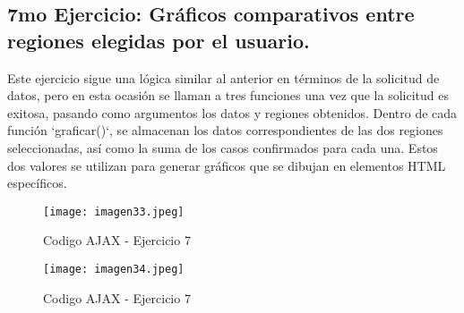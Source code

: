 \documentclass[10pt, a4paper]{article}
\begin{document}
	\subsection*{7mo Ejercicio: Gráficos comparativos entre regiones elegidas por el usuario.} 
	\begin{flushleft}
		Este ejercicio sigue una lógica similar al anterior en términos de la solicitud de datos, pero en esta ocasión se llaman a tres funciones una vez que la solicitud es exitosa, pasando como argumentos los datos y regiones obtenidos. Dentro de cada función `graficar()`, se almacenan los datos correspondientes de las dos regiones seleccionadas, así como la suma de los casos confirmados para cada una. Estos dos valores se utilizan para generar gráficos que se dibujan en elementos HTML específicos.
	\end{flushleft}
	\begin{figure}[h]
		\centering
		\texttt{[image: imagen33.jpeg]}
		\caption{Codigo AJAX - Ejercicio 7}
	\end{figure}
	\begin{figure}[h]
		\centering
		\texttt{[image: imagen34.jpeg]}
		\caption{Codigo AJAX - Ejercicio 7}
	\end{figure}
	\vspace*{50cm}
\end{document}
